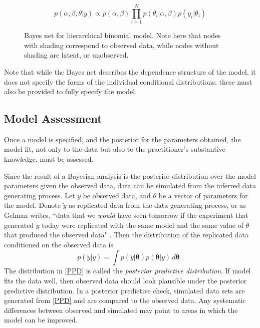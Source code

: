  \[ p(\alpha,\beta, \theta \vert y) \propto p(\alpha,\beta) \prod_{i = 1}^N p(\theta_i \vert \alpha, \beta) p(y_i\vert \theta_i)  \]

\begin{figure}[h!]

	\centering
	\caption[Hierarchical binomial model bayes net]{Bayes net for hierarchical binomial model.  Note here that nodes with shading correspond to observed data, while nodes without shading are latent, or unobserved.}
	\label{bayesnet}
\end{figure}

\noindent Note that while the Bayes net describes the dependence structure of the model, it does not specify the forms of the individual conditional distributions; these must also be provided to fully specify the model.

\subsection{Model Assessment}

Once a model is specified, and the posterior for the parameters obtained, the model fit, not only to the data but also to the practitioner's substantive knowledge, must be assessed.  

Since the result of a Bayesian analysis is the posterior distribution over the model parameters given the observed data, data can be simulated from the inferred data generating process.  Let $ y $ be observed data, and $ \theta $ be a vector of parameters for the model.  Denote $ \tilde{y} $ as replicated data from the data generating process, or as Gelman writes, ``data that we \textit{would} have seen tomorrow if the experiment that generated $ y $ today were replicated with the same model and the same value of $ \theta $ that produced the observed data" \cite[page~145]{gelman2013bayesian}.  Then the distribution of the replicated data conditioned on the observed data is 
%
\begin{equation}\label{PPD}
	p(\tilde{y} \vert y) = \int p(\tilde{y} \vert \bm{\theta}) p(\bm{\theta} \vert y) \, d\bm{\theta}  \>.
\end{equation}
%
The distribution in \cref{PPD} is called the \textit{posterior predictive distribution}.  If model fits the data well, then observed data should look plausible under the posterior predictive distribution. In a posterior predictive check, simulated data sets are generated from \cref{PPD} and are compared to the observed data.  Any systematic differences between observed and simulated may point to areas in which the model can be improved.

